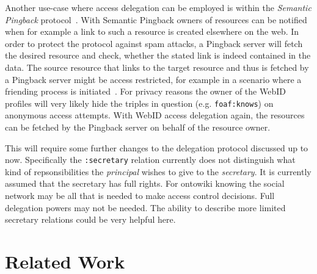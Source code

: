 \documentclass[a4paper]{llncs}
\begin{document}
Another use-case where access delegation can be employed is within the \textit{Semantic Pingback} protocol~\cite{tramp-s-2010--b}.
With Semantic Pingback owners of resources can be notified when for example a link to such a resource is created elsewhere on the web.
In order to protect the protocol against spam attacks, a Pingback server will fetch the desired resource and check, whether the stated link is indeed contained in the data.
The source resource that links to the target resource and thus is fetched by a Pingback server might be access restricted, for example in a scenario where a friending process is initiated~\cite{story-h-2011--a}.
For privacy reasons the owner of the WebID profiles will very likely hide the triples in question (e.g. \texttt{foaf:knows}) on anonymous access attempts.
With WebID access delegation again, the resources can be fetched by the Pingback server on behalf of the resource owner.

This will require some further changes to the delegation protocol discussed up to now. 
Specifically the \lstinline|:secretary| relation currently does not distinguish what kind of repsonsibilities the \textit{principal} wishes to give to the \textit{secretary}. 
It is currently assumed that the secretary has full rights. For ontowiki knowing the social network may be all that is needed to make access control decisions. 
Full delegation powers may not be needed. The ability to describe more limited secretary relations could be very helpful here.

\section{Related Work}\label{sec:relatedwork}

\end{document}
